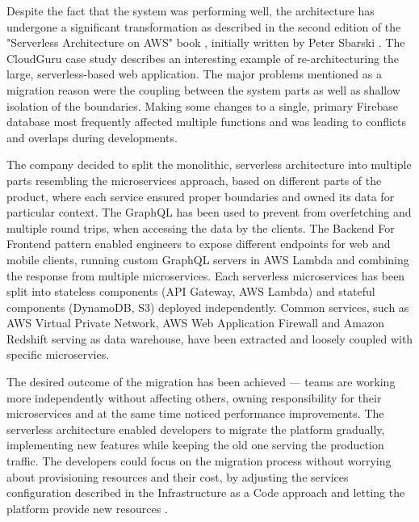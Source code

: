 Despite the fact that the system was performing well, the architecture has undergone a significant transformation as described in the second edition of the "Serverless Architecture on AWS" book \cite{ServerlessArchitectureOnAWSSecondEdition}, initially written by Peter Sbarski \cite{ServerlessArchitectureOnAWS}.
The CloudGuru case study describes an interesting example of re-architecturing the large, serverless-based web application.
The major problems mentioned as a migration reason were the coupling between the system parts as well as shallow isolation of the boundaries.
Making some changes to a single, primary Firebase database most frequently affected multiple functions and was leading to conflicts and overlaps during developments.

The company decided to split the monolithic, serverless architecture into multiple parts resembling the microservices approach, based on different parts of the product, where each service ensured proper boundaries and owned its data for particular context.
The GraphQL has been used to prevent from overfetching and multiple round trips, when accessing the data by the clients.
The Backend For Frontend pattern enabled engineers to expose different endpoints for web and mobile clients, running custom GraphQL servers in AWS Lambda and combining the response from multiple microservices.
Each serverless microservices has been split into stateless components (API Gateway, AWS Lambda) and stateful components (DynamoDB, S3) deployed independently.
Common services, such as AWS Virtual Private Network, AWS Web Application Firewall and Amazon Redshift serving as data warehouse, have been extracted and loosely coupled with specific microservies.

The desired outcome of the migration has been achieved --- teams are working more independently without affecting others, owning responsibility for their microservices and at the same time noticed performance improvements.
The serverless architecture enabled developers to migrate the platform gradually, implementing new features while keeping the old one serving the production traffic.
The developers could focus on the migration process without worrying about provisioning resources and their cost, by adjusting the services configuration described in the Infrastructure as a Code approach and letting the platform provide new resources \cite{ServerlessArchitectureOnAWS}.




